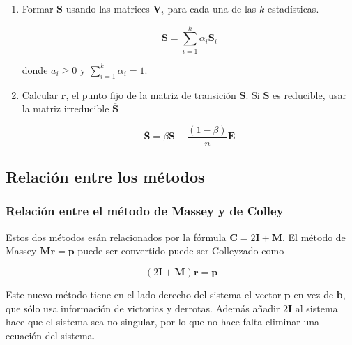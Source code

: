 \begin{enumerate}
\item Formar $\mathbf{S}$ usando las matrices $\mathbf{V}_i$ para cada una de las $k$ estadísticas.

\[ \mathbf{S} = \sum_{i=1}^{k} \alpha_i \mathbf{S}_i \]

donde $a_i \geq 0$ y $\sum_{i=1}^{k} \alpha_i = 1$.

\item Calcular $\mathbf{r}$, el punto fijo de la matriz de transición $\mathbf{S}$. Si $\mathbf{S}$ es reducible, usar la matriz irreducible $\overline{\mathbf{S}}$

\[\overline{\mathbf{S}} = \beta \mathbf{S} + \dfrac{(1 - \beta)}{n} \mathbf{E}\]
\end{enumerate}

\subsection{Relación entre los métodos}

\subsubsection{Relación entre el método de Massey y de Colley}

Estos dos métodos esán relacionados por la fórmula $\mathbf{C} = 2\mathbf{I} + \mathbf{M}$. El método de Massey $\mathbf{M r} = \mathbf{p}$ puede ser convertido puede ser Colleyzado como

\[ (2\mathbf{I} + \mathbf{M})\mathbf{r} = \mathbf{p} \]

Este nuevo método tiene en el lado derecho del sistema el vector $\mathbf{p}$ en vez de $\mathbf{b}$, que sólo usa información de victorias y derrotas. Además añadir $2\mathbf{I}$ al sistema hace que el sistema sea no singular, por lo que no hace falta eliminar una ecuación del sistema.

